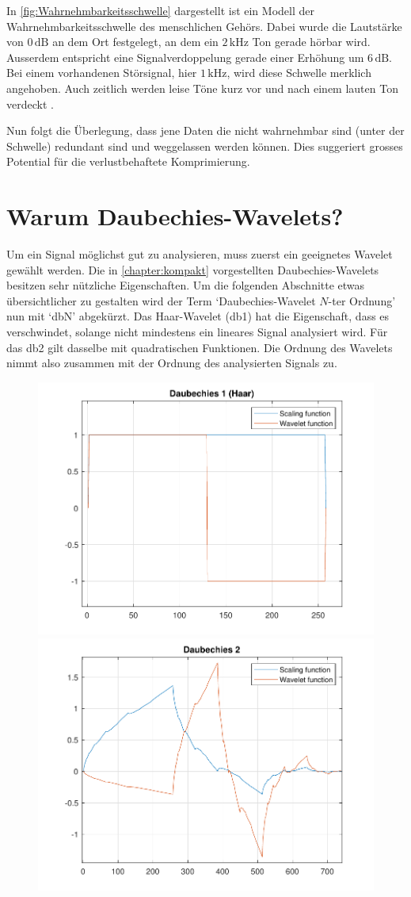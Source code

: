 \begin{refsection}
In \autoref{fig:Wahrnehmbarkeitsschwelle} dargestellt ist ein Modell der Wahrnehmbarkeitsschwelle des menschlichen Gehörs.
Dabei wurde die Lautstärke von $0\,\text{dB}$ an dem Ort festgelegt, an dem ein $2\,\text{kHz}$ Ton gerade hörbar wird.
Ausserdem entspricht eine Signalverdoppelung gerade einer Erhöhung um $6\,\text{dB}$. 
Bei einem vorhandenen Störsignal, hier $1\,\text{kHz}$, wird diese Schwelle merklich angehoben.
Auch zeitlich werden leise Töne kurz vor und nach einem lauten Ton verdeckt \cite{wikipedia:Psychoakustik}.

Nun folgt die Überlegung, dass jene Daten die nicht wahrnehmbar sind (unter der Schwelle) redundant sind und weggelassen werden können.
Dies suggeriert grosses Potential für die verlustbehaftete Komprimierung.

\section{Warum Daubechies-Wavelets?}
\label{chapter:daubechies}
Um ein Signal möglichst gut zu analysieren, muss zuerst ein geeignetes Wavelet gewählt werden.
Die in \autoref{chapter:kompakt} vorgestellten Daubechies-Wavelets besitzen sehr nützliche Eigenschaften.
Um die folgenden Abschnitte etwas übersichtlicher zu gestalten wird der Term `Daubechies-Wavelet $N$-ter Ordnung' nun mit `dbN' abgekürzt.
Das Haar-Wavelet (db1) hat die Eigenschaft, dass es verschwindet, solange nicht mindestens ein lineares Signal analysiert wird.
Für das db2 gilt dasselbe mit quadratischen Funktionen. 
Die Ordnung des Wavelets nimmt also zusammen mit der Ordnung des analysierten Signals zu.
\begin{figure}
	\includegraphics[width=0.5\linewidth]{papers/compress/Bilder/db1}
	\includegraphics[width=0.5\linewidth]{papers/compress/Bilder/db2}

\end{figure}
\end{refsection}
